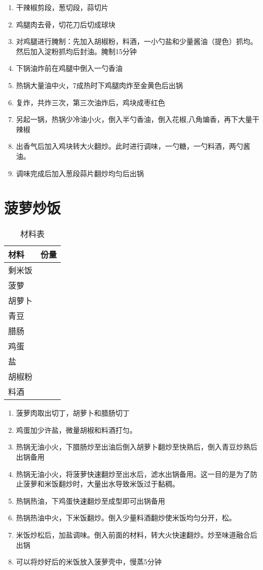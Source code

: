 \begin{enumerate}
    \item 干辣椒剪段，葱切段，蒜切片
    \item 鸡腿肉去骨，切花刀后切成球块
    \item 对鸡腿进行腌制：先加入胡椒粉，料酒，一小勺盐和少量酱油（提色）抓均。然后加入淀粉抓均后封油。腌制15分钟
    \item 下锅油炸前在鸡腿中倒入一勺香油
    \item 热锅大量油中火，7成热时下鸡腿肉炸至金黄色后出锅
    \item 复炸，共炸三次，第三次油炸后，鸡块成枣红色
    \item 另起一锅，热锅少冷油小火，倒入半勺香油，倒入花椒,八角煸香，再下大量干辣椒
    \item 出香气后加入鸡块转大火翻炒。此时进行调味，一勺糖，一勺料酒，两勺酱油。
    \item 调味完成后加入葱段蒜片翻炒均匀后出锅
\end{enumerate}




\section{菠萝炒饭}

\begin{table}[H]
    \centering
    \begin{tabular}{|l||c|}\hline
     \textbf{材料}    &  \textbf{份量}\\ \hline\hline
    剩米饭   &   \\ \hline
    菠萝   &   \\ \hline
    胡萝卜    &  \\ \hline
    青豆 & \\ \hline 
    腊肠 & \\ \hline 
    鸡蛋 &  \\ \hline
    盐 & \\ \hline 
    胡椒粉 &  \\ \hline
    料酒 & \\ \hline 
    \end{tabular}
    \caption{材料表}
\end{table}

\begin{enumerate}
    \item 菠萝肉取出切丁，胡萝卜和腊肠切丁
    \item 鸡蛋加少许盐，微量胡椒和料酒打匀。
    \item 热锅无油小火，下腊肠炒至出油后倒入胡萝卜翻炒至快熟后，倒入青豆炒熟后出锅备用
    \item 热锅无油小火，将菠萝快速翻炒至出水后，滤水出锅备用。这一目的是为了防止菠萝和米饭翻炒时，大量出水导致米饭过于黏稠。
    \item 热锅热油，下鸡蛋快速翻炒至成型即可出锅备用
    \item 热锅热油中火，下米饭翻炒。倒入少量料酒翻炒使米饭均匀分开，松。
    \item 米饭炒松后，加盐调味。倒入前面的材料，转大火快速翻炒。炒至味道融合后出锅
    \item 可以将炒好后的米饭放入菠萝壳中，慢蒸5分钟
\end{enumerate}



